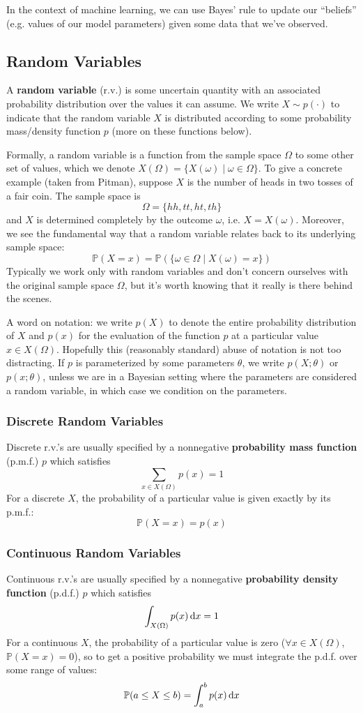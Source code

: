\documentclass{article}
\newcommand{\pr}[1]{\mathbb{P}(#1)}
\newcommand{\term}[1]{\textbf{#1}}
\begin{document}
In the context of machine learning, we can use Bayes' rule to update our ``beliefs'' (e.g. values of our model parameters) given some data that we've observed.

\subsection{Random Variables}
A \term{random variable} (r.v.) is some uncertain quantity with an associated probability distribution over the values it can assume. We write $X \sim p(\cdot)$ to indicate that the random variable $X$ is distributed according to some probability mass/density function $p$ (more on these functions below).

Formally, a random variable is a function from the sample space $\Omega$ to some other set of values, which we denote $X(\Omega) = \{X(\omega) \mid \omega \in \Omega\}$. To give a concrete example (taken from Pitman), suppose $X$ is the number of heads in two tosses of a fair coin. The sample space is
\[\Omega = \{hh, tt, ht, th\}\]
and $X$ is determined completely by the outcome $\omega$, i.e. $X = X(\omega)$. Moreover, we see the fundamental way that a random variable relates back to its underlying sample space:
\[\pr{X = x} = \pr{\{\omega \in \Omega \mid X(\omega) = x\}}\]
Typically we work only with random variables and don't concern ourselves with the original sample space $\Omega$, but it's worth knowing that it really is there behind the scenes.

A word on notation: we write $p(X)$ to denote the entire probability distribution of $X$ and $p(x)$ for the evaluation of the function $p$ at a particular value $x \in X(\Omega)$. Hopefully this (reasonably standard) abuse of notation is not too distracting. If $p$ is parameterized by some parameters $\theta$, we write $p(X; \theta)$ or $p(x; \theta)$, unless we are in a Bayesian setting where the parameters are considered a random variable, in which case we condition on the parameters.

\subsubsection{Discrete Random Variables}
Discrete r.v.'s are usually specified by a nonnegative \term{probability mass function} (p.m.f.) $p$ which satisfies
\[\sum_{x \in X(\Omega)} p(x) = 1\]
For a discrete $X$, the probability of a particular value is given exactly by its p.m.f.:
\[\pr{X = x} = p(x)\]

\subsubsection{Continuous Random Variables}
Continuous r.v.'s are usually specified by a nonnegative \term{probability density function} (p.d.f.) $p$ which satisfies
\[\int_{X(\Omega)} p(x) \dif{x} = 1\]
For a continuous $X$, the probability of a particular value is zero ($\forall x \in X(\Omega)$, $\pr{X = x} = 0$), so to get a positive probability we must integrate the p.d.f. over some range of values:
\[\pr{a \leq X \leq b} = \int_a^b p(x)\dif{x}\]
\end{document}
